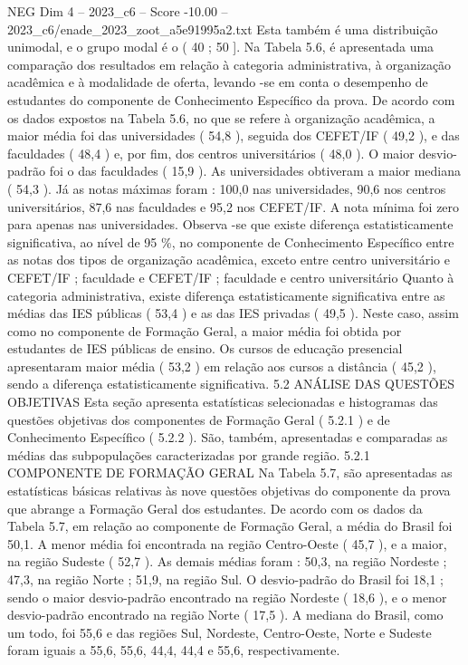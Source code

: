 \begin{textsample}{NEG Dim 4 – 2023\_c6 – Score -10.00 – 2023\_c6/enade\_2023\_zoot\_a5e91995a2.txt}
Esta também é uma distribuição unimodal, e o grupo modal é o ( 40 ; 50 ].
Na Tabela 5.6, é apresentada uma comparação dos resultados em relação à categoria administrativa, à organização acadêmica e à modalidade de oferta, levando -se em conta o desempenho de estudantes do componente de Conhecimento Específico da prova.
De acordo com os dados expostos na Tabela 5.6, no que se refere à organização acadêmica, a maior média foi das universidades ( 54,8 ), seguida dos CEFET/IF ( 49,2 ), e das faculdades ( 48,4 ) e, por fim, dos centros universitários ( 48,0 ).
O maior desvio-padrão foi o das faculdades ( 15,9 ).
As universidades obtiveram a maior mediana ( 54,3 ).
Já as notas máximas foram : 100,0 nas universidades, 90,6 nos centros universitários, 87,6 nas faculdades e 95,2 nos CEFET/IF.
A nota mínima foi zero para apenas nas universidades.
Observa -se que existe diferença estatisticamente significativa, ao nível de 95 \%, no componente de Conhecimento Específico entre as notas dos tipos de organização acadêmica, exceto entre centro universitário e CEFET/IF ; faculdade e CEFET/IF ; faculdade e centro universitário Quanto à categoria administrativa, existe diferença estatisticamente significativa entre as médias das IES públicas ( 53,4 ) e as das IES privadas ( 49,5 ).
Neste caso, assim como no componente de Formação Geral, a maior média foi obtida por estudantes de IES públicas de ensino.
Os cursos de educação presencial apresentaram maior média ( 53,2 ) em relação aos cursos a distância ( 45,2 ), sendo a diferença estatisticamente significativa. 5.2 ANÁLISE DAS QUESTÕES OBJETIVAS Esta seção apresenta estatísticas selecionadas e histogramas das questões objetivas dos componentes de Formação Geral ( 5.2.1 ) e de Conhecimento Específico ( 5.2.2 ).
São, também, apresentadas e comparadas as médias das subpopulações caracterizadas por grande região. 5.2.1 COMPONENTE DE FORMAÇÃO GERAL Na Tabela 5.7, são apresentadas as estatísticas básicas relativas às nove questões objetivas do componente da prova que abrange a Formação Geral dos estudantes.
De acordo com os dados da Tabela 5.7, em relação ao componente de Formação Geral, a média do Brasil foi 50,1.
A menor média foi encontrada na região Centro-Oeste ( 45,7 ), e a maior, na região Sudeste ( 52,7 ).
As demais médias foram : 50,3, na região Nordeste ; 47,3, na região Norte ; 51,9, na região Sul.
O desvio-padrão do Brasil foi 18,1 ; sendo o maior desvio-padrão encontrado na região Nordeste ( 18,6 ), e o menor desvio-padrão encontrado na região Norte ( 17,5 ).
A mediana do Brasil, como um todo, foi 55,6 e das regiões Sul, Nordeste, Centro-Oeste, Norte e Sudeste foram iguais a 55,6, 55,6, 44,4, 44,4 e 55,6, respectivamente.

\end{textsample}
